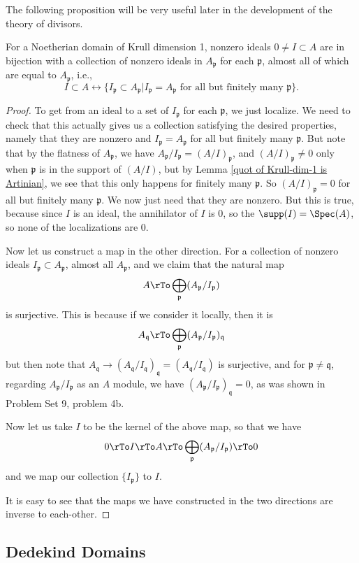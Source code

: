 \documentclass[12 pt]{article}
\theoremstyle{definition}
\newcommand\fp{{\mathfrak p}}
\newcommand\fq{{\mathfrak q}}
\begin{document}
The following proposition will be very useful later in the development of the theory of divisors.

\begin{proposition} For a Noetherian domain of Krull dimension 1, nonzero ideals $0 \neq I \subset A$ are in bijection with a collection of nonzero ideals in $A_{\fp}$ for each $\fp$, almost all of which are equal to $A_{\fp}$, i.e.,
\[I \subset A \longleftrightarrow \{I_{\fp} \subset A_{\fp} | I_{\fp} =A_{\fp} \text{ for all but finitely many $\fp$}\}.\]
\label{I correspond to I_p}
\end{proposition}
\begin{proof} To get from an ideal to a set of $I_{\fp}$ for each $\fp$, we just localize. We need to check that this actually gives us a collection satisfying the desired properties, namely that they are nonzero and $I_{\fp}=A_{\fp}$ for all but finitely many $\fp$. But note that by the flatness of $A_{\fp}$, we have $A_{\fp}/I_{\fp}=(A/I)_{\fp}$, and $(A/I)_{\fp} \neq 0$ only when $\fp$ is in the support of $(A/I)$, but by Lemma \ref{quot of Krull-dim-1 is Artinian}, we see that this only happens for finitely many $\fp$. So $(A/I)_{\fp} =0 $ for all but finitely many $\fp$. We now just need that they are nonzero. But this is true, because since $I$ is an ideal, the annihilator of $I$ is 0, so the $\supp(I)=\Spec(A)$, so none of the localizations are 0.

Now let us construct a map in the other direction. For a collection  of nonzero ideals $I_{\fp} \subset A_{\fp}$, almost all $A_{\fp}$, and we claim that the natural map
\[A \rTo \bigoplus_{\fp}(A_{\fp}/I_{\fp})\]
is surjective.
This is because if we consider it locally, then it is
\[A_{\fq} \rTo \bigoplus_{\fp}(A_{\fp}/I_{\fp})_\fq\]
but then note that $A_{\fq} \to (A_{\fq}/I_{\fq})_{\fq}=(A_{\fq}/I_{\fq})$ is surjective, and for $\fp \neq \fq$, regarding $A_\fp/I_\fp$ as an $A$ module, we have $(A_{\fp}/I_{\fp})_{\fq}=0$, as was shown in Problem Set 9, problem 4b.

Now let us take $I$ to be the kernel of the above map, so that we have
\[0 \rTo I \rTo A \rTo \bigoplus_{\fp}(A_{\fp}/I_{\fp}) \rTo 0\]
and we map our collection $\{I_{\fp}\}$ to $I$.

It is easy to see that the maps we have constructed in the two directions are inverse to each-other.
\end{proof}


\subsection{Dedekind Domains}
\end{document}
